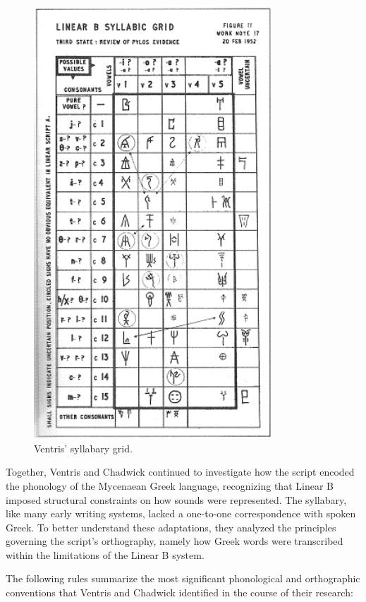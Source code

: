 \begin{figure}[H]
\centering
\includegraphics[width=0.8\textwidth]{Images/ventris_grid.png}
\caption{Ventris' syllabary grid.}
\label{fig:ventris_grid}
\end{figure}

Together, Ventris and Chadwick continued to investigate how the script encoded the phonology of the Mycenaean Greek language, recognizing that Linear B imposed structural constraints on how sounds were represented.
The syllabary, like many early writing systems, lacked a one-to-one correspondence with spoken Greek.
To better understand these adaptations, they analyzed the principles governing the script's orthography, namely how Greek words were transcribed within the limitations of the Linear B system.

The following rules summarize the most significant phonological and orthographic conventions that Ventris and Chadwick identified in the course of their research:

